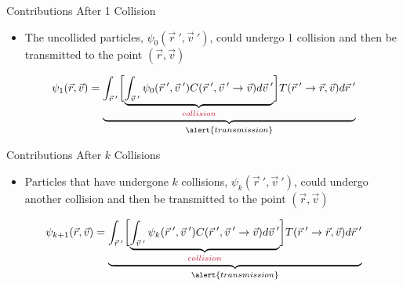 \documentclass[xcolor=x11names,compress]{beamer}
\renewcommand{\(}{\begin{columns}}
\renewcommand{\)}{\end{columns}}
\newcommand{\<}[1]{\begin{column}{#1}}
\renewcommand{\>}{\end{column}}
\begin{document}
\begin{frame}{Contributions After 1 Collision}

\begin{itemize}
\item The uncollided particles, $\psi_0(\vec{r}\:', \vec{v}\:')$, could undergo 1 \textcolor{cardinal}{collision} and then be \alert{transmitted} to the point $(\vec{r}, \vec{v})$
\end{itemize}

\[\psi_1(\vec{r}, \vec{v}) = \underbrace{\int_{\vec{r}\:'} \biggl[ \underbrace{\int_{\vec{v}\:'} \psi_0(\vec{r}\:', \vec{v}\:') C(\vec{r}\:', \vec{v}\:' \rightarrow \vec{v})  d\vec{v}\:'}_{\textcolor{cardinal}{collision}}\biggr] T(\vec{r}\:' \rightarrow \vec{r}, \vec{v}) d\vec{r}\:'}_{\alert{transmission}}\]

\end{frame}


\begin{frame}{Contributions After $k$ Collisions}

\begin{itemize}
\item Particles that have undergone $k$ collisions, $\psi_k(\vec{r}\:', \vec{v}\:')$, could undergo another \textcolor{cardinal}{collision} and then be \alert{transmitted} to the point $(\vec{r}, \vec{v})$ 
\end{itemize}

\[\psi_{k+1}(\vec{r}, \vec{v}) = \underbrace{\int_{\vec{r}\:'} \biggl[ \underbrace{\int_{\vec{v}\:'} \psi_k(\vec{r}\:', \vec{v}\:') C(\vec{r}\:', \vec{v}\:' \rightarrow \vec{v})  d\vec{v}\:'}_{\textcolor{cardinal}{collision}}\biggr] T(\vec{r}\:' \rightarrow \vec{r}, \vec{v}) d\vec{r}\:'}_{\alert{transmission}}\]

\end{frame}
\end{document}
